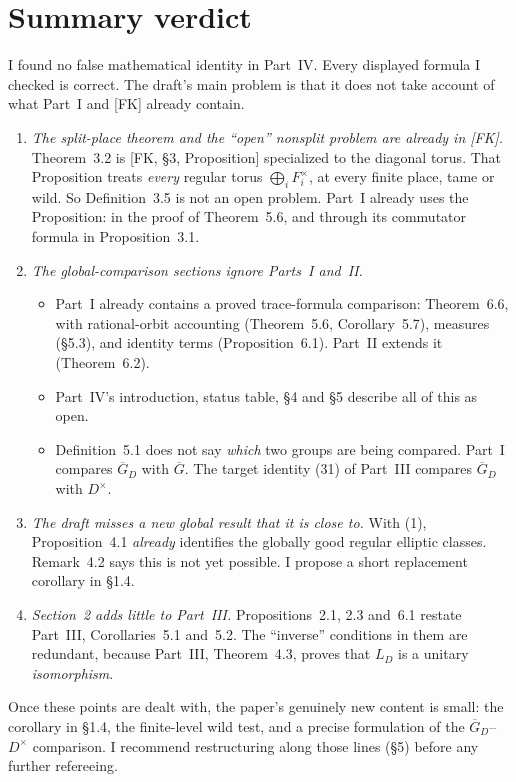 \documentclass[11pt]{article}
\newcommand{\Gb}{\overline G}
\newcommand{\GDb}{\overline G_D}
\theoremstyle{definition}
\begin{document}
\section*{Summary verdict}
I found no false mathematical identity in Part~IV. Every displayed
formula I checked is correct. The draft's main problem is that it does
not take account of what Part~I and [FK] already contain.
\begin{enumerate}[label=(\arabic*)]
\item \emph{The split-place theorem and the ``open'' nonsplit problem are
already in [FK].} Theorem~3.2 is [FK, \S3, Proposition] specialized to
the diagonal torus. That Proposition treats \emph{every} regular torus
$\bigoplus_iF_i^\times$, at every finite place, tame or wild. So
Definition~3.5 is not an open problem. Part~I already uses the
Proposition: in the proof of Theorem~5.6, and through its commutator
formula in Proposition~3.1.
\item \emph{The global-comparison sections ignore Parts~I and~II.}
\begin{itemize}
\item Part~I already contains a proved trace-formula comparison:
Theorem~6.6, with rational-orbit accounting (Theorem~5.6,
Corollary~5.7), measures (\S5.3), and identity terms (Proposition~6.1).
Part~II extends it (Theorem~6.2).
\item Part~IV's introduction, status table, \S4 and \S5 describe all of
this as open.
\item Definition~5.1 does not say \emph{which} two groups are being
compared. Part~I compares $\GDb$ with $\Gb$. The target identity
(31) of Part~III compares $\GDb$ with $D^\times$.
\end{itemize}
\item \emph{The draft misses a new global result that it is close to.}
With (1), Proposition~4.1 \emph{already} identifies the globally good
regular elliptic classes. Remark~4.2 says this is not yet possible.
I propose a short replacement corollary in \S1.4.
\item \emph{Section~2 adds little to Part~III.} Propositions~2.1, 2.3 and~6.1
restate Part~III, Corollaries~5.1 and~5.2. The ``inverse'' conditions
in them are redundant, because Part~III, Theorem~4.3, proves that $L_D$
is a unitary \emph{isomorphism}.
\end{enumerate}
Once these points are dealt with, the paper's genuinely new content is
small: the corollary in \S1.4, the finite-level wild test, and a precise
formulation of the $\GDb$--$D^\times$ comparison. I recommend
restructuring along those lines (\S5) before any further refereeing.
\end{document}
